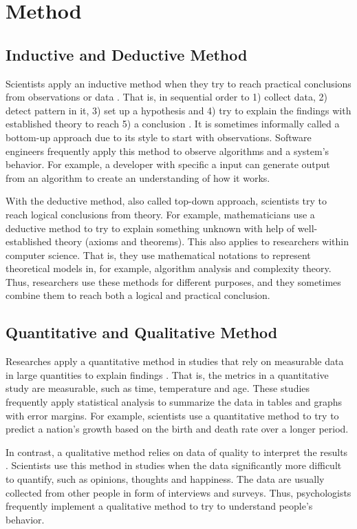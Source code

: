 \documentclass[a4paper,11pt]{kth-mag}
\newcommand*{\skippara}{\par\vspace{\baselineskip} \noindent}
\begin{document}
\chapter{Method}

\section{Inductive and Deductive Method}
Scientists apply an inductive method when they try to reach practical conclusions from observations or data \cite{Omexperi69:online}.
That is, in sequential order to 1) collect data, 2) detect pattern in it, 3) set up a hypothesis and 4) try to explain the findings with established theory to reach 5) a conclusion \cite{web:induction}.
It is sometimes informally called a bottom-up approach due to its style to start with observations.
Software engineers frequently apply this method to observe algorithms and a system's behavior.
For example, a developer with specific a input can generate output from an algorithm to create an understanding of how it works.

\skippara With the deductive method, also called top-down approach, scientists try to reach logical conclusions from theory.
For example, mathematicians use a deductive method to try to explain something unknown with help of well-established theory (axioms and theorems).
This also applies to researchers within computer science.
That is, they use mathematical notations to represent theoretical models in, for example, algorithm analysis and complexity theory.
Thus, researchers use these methods for different purposes, and they sometimes combine them to reach both a logical and practical conclusion.

\section{Quantitative and Qualitative Method}

Researches apply a quantitative method in studies that rely on measurable data in large quantities to explain findings \cite{haakansson2013portal}.
That is, the metrics in a quantitative study are measurable, such as time, temperature and age.
These studies frequently apply statistical analysis to summarize the data in tables and graphs with error margins.
For example, scientists use a quantitative method to try to predict a nation's growth based on the birth and death rate over a longer period.

\skippara In contrast, a qualitative method relies on data of quality to interpret the results \cite{merriam2009qualitative}.
Scientists use this method in studies when the data significantly more difficult to quantify, such as opinions, thoughts and happiness.
The data are usually collected from other people in form of interviews and surveys.
Thus, psychologists frequently implement a qualitative method to try to understand people's behavior.
\end{document}
